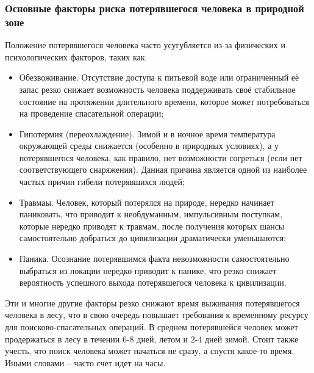 \subsubsection{Основные факторы риска потерявшегося человека в природной зоне}

Положение потерявшегося человека часто усугубляется из-за физических и психологических факторов, таких как:

\begin{itemize}
    \item Обезвоживание. Отсутствие доступа к питьевой воде или ограниченный её запас резко снижает возможность человека поддерживать своё стабильное состояние на протяжении длительного времени, которое может потребоваться на проведение спасательной операции;
    \item Гипотермия (переохлаждение). Зимой и в ночное время температура окружающей среды снижается (особенно в природных условиях), а у потерявшегося человека, как правило, нет возможности согреться (если нет соответствующего снаряжения). Данная причина является одной из наиболее частых причин гибели потерявшихся людей;
    \item Травмаы. Человек, который потерялся на природе, нередко начинает паниковать, что приводит к необдуманным, импульсивным поступкам, которые нередко приводят к травмам, после получения которых шансы самостоятельно добраться до цивилизации драматически уменьшаются;
    \item Паника. Осознание потерявшимся факта невозможности самостоятельно выбраться из локации нередко приводит к панике, что резко снижает вероятность успешного выхода потерявшегося человека к цивилизации.
\end{itemize}

Эти и многие другие факторы резко снижают время выживания потерявшегося человека в лесу, что в свою очередь повышает требования к временному ресурсу для поисково-спасательных операций. В среднем потерявшейся человек может продержаться в лесу в течении 6-8 дней, летом и 2-4 дней зимой. Стоит также учесть, что поиск человека может начаться не сразу, а спустя какое-то время. Иными словами -- часто счет идет на часы.